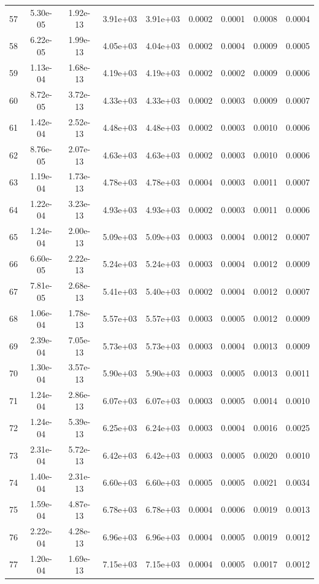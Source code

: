 \begin{longtable}{ccccccccc}
57 & 5.30e-05 & 1.92e-13 & 3.91e+03 & 3.91e+03 & 0.0002 & 0.0001 & 0.0008 & 0.0004 \\
58 & 6.22e-05 & 1.99e-13 & 4.05e+03 & 4.04e+03 & 0.0002 & 0.0004 & 0.0009 & 0.0005 \\
59 & 1.13e-04 & 1.68e-13 & 4.19e+03 & 4.19e+03 & 0.0002 & 0.0002 & 0.0009 & 0.0006 \\
60 & 8.72e-05 & 3.72e-13 & 4.33e+03 & 4.33e+03 & 0.0002 & 0.0003 & 0.0009 & 0.0007 \\
61 & 1.42e-04 & 2.52e-13 & 4.48e+03 & 4.48e+03 & 0.0002 & 0.0003 & 0.0010 & 0.0006 \\
62 & 8.76e-05 & 2.07e-13 & 4.63e+03 & 4.63e+03 & 0.0002 & 0.0003 & 0.0010 & 0.0006 \\
63 & 1.19e-04 & 1.73e-13 & 4.78e+03 & 4.78e+03 & 0.0004 & 0.0003 & 0.0011 & 0.0007 \\
64 & 1.22e-04 & 3.23e-13 & 4.93e+03 & 4.93e+03 & 0.0002 & 0.0003 & 0.0011 & 0.0006 \\
65 & 1.24e-04 & 2.00e-13 & 5.09e+03 & 5.09e+03 & 0.0003 & 0.0004 & 0.0012 & 0.0007 \\
66 & 6.60e-05 & 2.22e-13 & 5.24e+03 & 5.24e+03 & 0.0003 & 0.0004 & 0.0012 & 0.0009 \\
67 & 7.81e-05 & 2.68e-13 & 5.41e+03 & 5.40e+03 & 0.0002 & 0.0004 & 0.0012 & 0.0007 \\
68 & 1.06e-04 & 1.78e-13 & 5.57e+03 & 5.57e+03 & 0.0003 & 0.0005 & 0.0012 & 0.0009 \\
69 & 2.39e-04 & 7.05e-13 & 5.73e+03 & 5.73e+03 & 0.0003 & 0.0004 & 0.0013 & 0.0009 \\
70 & 1.30e-04 & 3.57e-13 & 5.90e+03 & 5.90e+03 & 0.0003 & 0.0005 & 0.0013 & 0.0011 \\
71 & 1.24e-04 & 2.86e-13 & 6.07e+03 & 6.07e+03 & 0.0003 & 0.0005 & 0.0014 & 0.0010 \\
72 & 1.24e-04 & 5.39e-13 & 6.25e+03 & 6.24e+03 & 0.0003 & 0.0004 & 0.0016 & 0.0025 \\
73 & 2.31e-04 & 5.72e-13 & 6.42e+03 & 6.42e+03 & 0.0003 & 0.0005 & 0.0020 & 0.0010 \\
74 & 1.40e-04 & 2.31e-13 & 6.60e+03 & 6.60e+03 & 0.0005 & 0.0005 & 0.0021 & 0.0034 \\
75 & 1.59e-04 & 4.87e-13 & 6.78e+03 & 6.78e+03 & 0.0004 & 0.0006 & 0.0019 & 0.0013 \\
76 & 2.22e-04 & 4.28e-13 & 6.96e+03 & 6.96e+03 & 0.0004 & 0.0005 & 0.0019 & 0.0012 \\
77 & 1.20e-04 & 1.69e-13 & 7.15e+03 & 7.15e+03 & 0.0004 & 0.0005 & 0.0017 & 0.0012 \\

\end{longtable}
